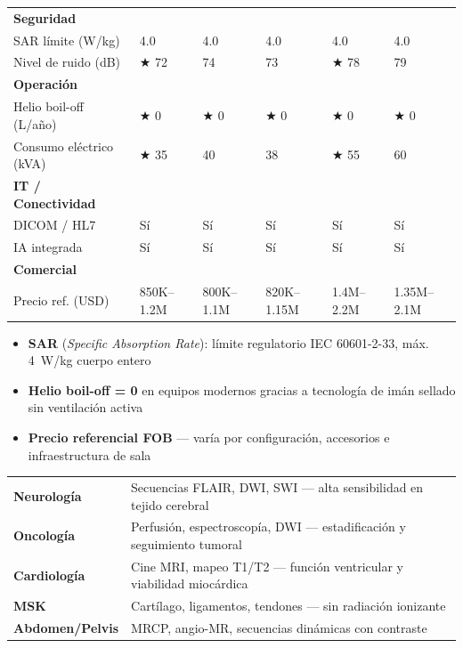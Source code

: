 \documentclass[11pt, a4paper]{article}
\begin{document}
\begin{center}
\begin{tabular}{P{4.2cm} C{2cm} C{2cm} C{2cm} C{2cm} C{2cm}}
\small\textbf{Seguridad} & & & & & \\
SAR límite (W/kg)          & 4.0 & 4.0 & 4.0 & 4.0 & 4.0 \\
Nivel de ruido (dB)        & $\bigstar$ 72 & 74 & 73 & $\bigstar$ 78 & 79 \\
\small\textbf{Operación} & & & & & \\
Helio boil-off (L/año)     & $\bigstar$ 0 & $\bigstar$ 0 & $\bigstar$ 0 & $\bigstar$ 0 & $\bigstar$ 0 \\
Consumo eléctrico (kVA)    & $\bigstar$ 35 & 40 & 38 & $\bigstar$ 55 & 60 \\
\small\textbf{IT / Conectividad} & & & & & \\
DICOM / HL7                & Sí & Sí & Sí & Sí & Sí \\
IA integrada               & Sí & Sí & Sí & Sí & Sí \\
\small\textbf{Comercial} & & & & & \\
Precio ref. (USD)          & 850K--1.2M & 800K--1.1M & 820K--1.15M & 1.4M--2.2M & 1.35M--2.1M \\
\bottomrule
\end{tabular}
\end{center}

\vspace{4pt}
\begin{itemize}[leftmargin=*, itemsep=2pt, topsep=2pt]
  \footnotesize
  \item \textbf{SAR} (\textit{Specific Absorption Rate}): límite regulatorio IEC 60601-2-33, máx. 4~W/kg cuerpo entero
  \item \textbf{Helio boil-off = 0} en equipos modernos gracias a tecnología de imán sellado sin ventilación activa
  \item \textbf{Precio referencial FOB} — varía por configuración, accesorios e infraestructura de sala
\end{itemize}

\begin{clinicbox}
\begin{tabular}{@{}P{3cm} P{10.5cm}@{}}
\textbf{Neurología}     & Secuencias FLAIR, DWI, SWI --- alta sensibilidad en tejido cerebral \\[2pt]
\textbf{Oncología}      & Perfusión, espectroscopía, DWI --- estadificación y seguimiento tumoral \\[2pt]
\textbf{Cardiología}    & Cine MRI, mapeo T1/T2 --- función ventricular y viabilidad miocárdica \\[2pt]
\textbf{MSK}            & Cartílago, ligamentos, tendones --- sin radiación ionizante \\[2pt]
\textbf{Abdomen/Pelvis} & MRCP, angio-MR, secuencias dinámicas con contraste \\
\end{tabular}
\end{clinicbox}
\end{document}
